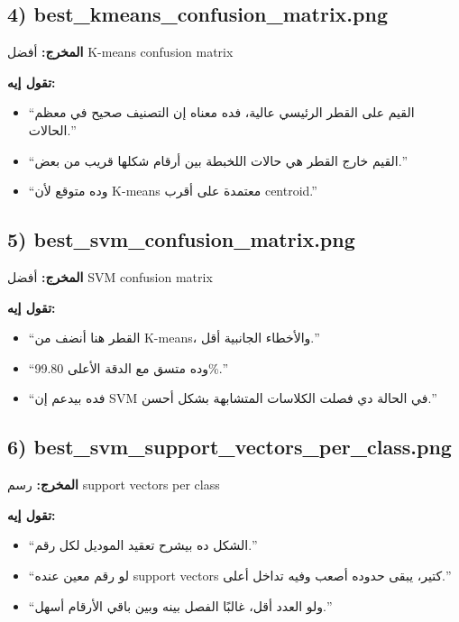 \documentclass[12pt,a4paper]{article}
\begin{document}
\subsection*{4) \textenglish{best\_kmeans\_confusion\_matrix.png}}
\textbf{المخرج:} أفضل \textenglish{K-means confusion matrix}

\textbf{تقول إيه:}
\begin{itemize}[leftmargin=1.5em]
    \item ``القيم على القطر الرئيسي عالية، فده معناه إن التصنيف صحيح في معظم الحالات.''
    \item ``القيم خارج القطر هي حالات اللخبطة بين أرقام شكلها قريب من بعض.''
    \item ``وده متوقع لأن \textenglish{K-means} معتمدة على أقرب \textenglish{centroid}.''
\end{itemize}

\subsection*{5) \textenglish{best\_svm\_confusion\_matrix.png}}
\textbf{المخرج:} أفضل \textenglish{SVM confusion matrix}

\textbf{تقول إيه:}
\begin{itemize}[leftmargin=1.5em]
    \item ``القطر هنا أنضف من \textenglish{K-means}، والأخطاء الجانبية أقل.''
    \item ``وده متسق مع الدقة الأعلى \textenglish{99.80\%}.''
    \item ``فده بيدعم إن \textenglish{SVM} في الحالة دي فصلت الكلاسات المتشابهة بشكل أحسن.''
\end{itemize}

\subsection*{6) \textenglish{best\_svm\_support\_vectors\_per\_class.png}}
\textbf{المخرج:} رسم \textenglish{support vectors per class}

\textbf{تقول إيه:}
\begin{itemize}[leftmargin=1.5em]
    \item ``الشكل ده بيشرح تعقيد الموديل لكل رقم.''
    \item ``لو رقم معين عنده \textenglish{support vectors} كتير، يبقى حدوده أصعب وفيه تداخل أعلى.''
    \item ``ولو العدد أقل، غالبًا الفصل بينه وبين باقي الأرقام أسهل.''
\end{itemize}
\end{document}

